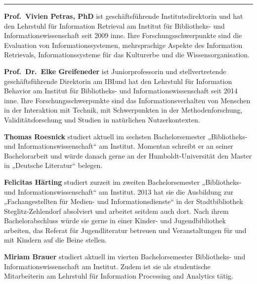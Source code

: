 \begin{center}\rule{0.5\linewidth}{\linethickness}\end{center}

\textbf{Prof.~Vivien Petras, PhD} ist geschäftsführende
Institutsdirektorin und hat den Lehrstuhl für Information Retrieval am
Institut für Bibliotheks- und Informationswissenschaft seit 2009 inne.
Ihre Forschungsschwerpunkte sind die Evaluation von
Informationssystemen, mehrsprachige Aspekte des Information Retrievals,
Informationssysteme für das Kulturerbe und die Wissensorganisation.

\textbf{Prof.~Dr.~Elke Greifeneder} ist Juniorprofessorin und
stellvertretende geschäftsführende Direktorin am IBIund hat den
Lehrstuhl für Information Behavior am Institut für Bibliotheks- und
Informationswissenschaft seit 2014 inne. Ihre Forschungsschwerpunkte
sind das Informationsverhalten von Menschen in der Interaktion mit
Technik, mit Schwerpunkten in der Methodenforschung, Validitätsforschung
und Studien in natürlichen Nutzerkontexten.

\textbf{Thomas Roesnick} studiert aktuell im sechsten Bachelorsemester
„Bibliotheks- und Informationswissenschaft`` am Institut. Momentan
schreibt er an seiner Bachelorarbeit und würde danach gerne an der
Humboldt-Universität den Master in „Deutsche Literatur`` belegen.

\textbf{Felicitas Härting} studiert zurzeit im zweiten Bachelorsemester
„Bibliotheks- und Informationswissenschaft`` am Institut. 2013 hat sie
die Ausbildung zur „Fachangestellten für Medien- und
Informationsdienste`` in der Stadtbibliothek Steglitz-Zehlendorf
absolviert und arbeitet seitdem auch dort. Nach ihrem Bachelorabschluss
würde sie gerne in einer Kinder- und Jugendbibliothek arbeiten, das
Referat für Jugendliteratur betreuen und Veranstaltungen für und mit
Kindern auf die Beine stellen.

\textbf{Miriam Brauer} studiert aktuell im vierten Bachelorsemester
Bibliotheks- und Informationswissenschaft am Institut. Zudem ist sie als
studentische Mitarbeiterin am Lehrstuhl für Information Processing and
Analytics tätig.

